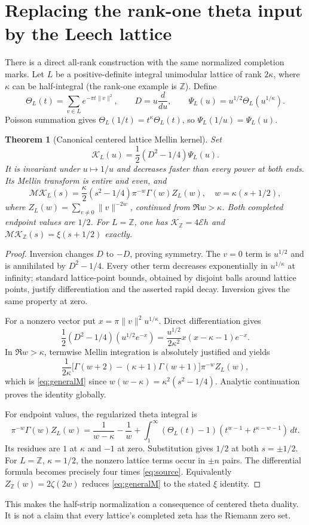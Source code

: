 \documentclass[11pt,reqno]{amsart}
\newtheorem{theorem}{Theorem}[section]
\theoremstyle{definition}\newtheorem{definition}[theorem]{Definition}
\theoremstyle{remark}\newtheorem{remark}[theorem]{Remark}
\newcommand{\Z}{\mathbb Z}\newcommand{\Q}{\mathbb Q}\newcommand{\R}{\mathbb R}\newcommand{\C}{\mathbb C}\newcommand{\F}{\mathbb F}
\newcommand{\M}{\mathcal M}\newcommand{\K}{\mathcal K}\newcommand{\E}{\mathcal E}
\begin{document}
\section{Replacing the rank-one theta input by the Leech lattice}
There is a direct all-rank construction with the same normalized completion marks. Let $L$ be a positive-definite integral unimodular lattice of rank $2\kappa$, where $\kappa$ can be half-integral (the rank-one example is $\Z$). Define
\[
\Theta_L(t)=\sum_{v\in L}e^{-\pi t\|v\|^2},\qquad
D=u\frac{d}{du},\qquad
\Psi_L(u)=u^{1/2}\Theta_L(u^{1/\kappa}).
\]
Poisson summation gives $\Theta_L(1/t)=t^\kappa\Theta_L(t)$, so $\Psi_L(1/u)=\Psi_L(u)$.

\begin{theorem}[Canonical centered lattice Mellin kernel]\label{thm:theta}
Set
\begin{equation}\label{eq:canonical}
\K_L(u)=\frac12(D^2-1/4)\Psi_L(u).
\end{equation}
It is invariant under $u\mapsto1/u$ and decreases faster than every power at both ends. Its Mellin transform is entire and even, and
\begin{equation}\label{eq:generalM}
\M\K_L(s)=\frac\kappa2(s^2-1/4)\pi^{-w}\Gamma(w)Z_L(w),
\quad w=\kappa(s+1/2),
\end{equation}
where $Z_L(w)=\sum_{v\ne0}\|v\|^{-2w}$, continued from $\Re w>\kappa$. Both completed endpoint values are $1/2$. For $L=\Z$, one has $\K_\Z=4\E h$ and $\M\K_\Z(s)=\xi(s+1/2)$ exactly.
\end{theorem}
\begin{proof}
Inversion changes $D$ to $-D$, proving symmetry. The $v=0$ term is $u^{1/2}$ and is annihilated by $D^2-1/4$. Every other term decreases exponentially in $u^{1/\kappa}$ at infinity; standard lattice-point bounds, obtained by disjoint balls around lattice points, justify differentiation and the asserted rapid decay. Inversion gives the same property at zero.

For a nonzero vector put $x=\pi\|v\|^2u^{1/\kappa}$. Direct differentiation gives
\[
\frac12(D^2-1/4)(u^{1/2}e^{-x})
=\frac{u^{1/2}}{2\kappa^2}x(x-\kappa-1)e^{-x}.
\]
In $\Re w>\kappa$, termwise Mellin integration is absolutely justified and yields
\[
\frac{1}{2\kappa}\bigl[\Gamma(w+2)-(\kappa+1)\Gamma(w+1)\bigr]
\pi^{-w}Z_L(w),
\]
which is \eqref{eq:generalM} since $w(w-\kappa)=\kappa^2(s^2-1/4)$. Analytic continuation proves the identity globally.

For endpoint values, the regularized theta integral is
\[
\pi^{-w}\Gamma(w)Z_L(w)=
\frac1{w-\kappa}-\frac1w+
\int_1^\infty(\Theta_L(t)-1)(t^{w-1}+t^{\kappa-w-1})\,dt.
\]
Its residues are $1$ at $\kappa$ and $-1$ at zero. Substitution gives $1/2$ at both $s=\pm1/2$.
For $L=\Z$, $\kappa=1/2$, the nonzero lattice terms occur in $\pm n$ pairs. The differential formula becomes precisely four times \eqref{eq:source}. Equivalently $Z_\Z(w)=2\zeta(2w)$ reduces \eqref{eq:generalM} to the stated $\xi$ identity.
\end{proof}
This makes the half-strip normalization a consequence of centered theta duality. It is not a claim that every lattice's completed zeta has the Riemann zero set.
\end{document}
